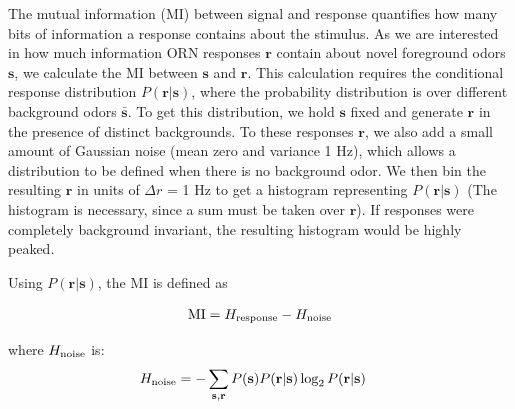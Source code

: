 \documentclass[9pt,lineno]{elife}
\begin{document}
{\color{blue} 
The mutual information (MI) between signal and response quantifies how many bits of information a response contains about the stimulus. As we are interested in how much information ORN responses $\mathbf r$ contain about novel foreground odors $\mathbf s$, we calculate the MI between $\mathbf s$ and $\mathbf r$. This calculation requires 
the conditional response distribution $P(\mathbf r| \mathbf s)$, where the probability distribution is over different background odors $\bar {\mathbf s}$. To get this distribution, we hold $\mathbf s$ fixed and generate $\mathbf r$ in the presence of distinct backgrounds. To these responses $\mathbf r$, we also add a small amount of Gaussian noise (mean zero and variance 1 Hz), which allows a distribution to be defined when there is no background odor. We then bin the resulting $\mathbf r$ in units of $\Delta r$ = 1 Hz to get a histogram representing $P(\mathbf r| \mathbf s)$ (The histogram is necessary, since a sum must be taken over $\mathbf r$). If responses were completely background invariant, the resulting histogram would be highly peaked. 


Using $P(\mathbf r| \mathbf s)$, the MI is defined as

\begin{align*}
\textup{MI} = H_{\textup{response}} - H_{\textup{noise}}
\end{align*}

where $H_{\textup{noise}}$ is:
\begin{align*}
H_{\textup{noise}} &= -\sum_{\mathbf s, \mathbf r} P(\mathbf s) 
                P(\mathbf r| \mathbf s) \log_2 P(\mathbf r| \mathbf s) 
\end{align*}

}
\end{document}
